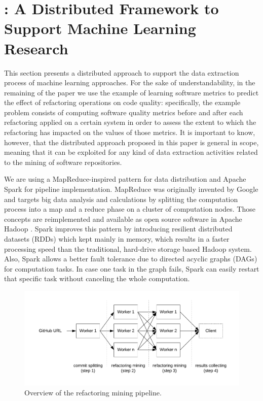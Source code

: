 
\section{\iris: A Distributed Framework to Support Machine Learning Research}
\label{sec:approach}

This section presents a distributed approach to support the data extraction process of machine learning approaches. For the sake of understandability, in the remaining of the paper we use the example of learning software metrics to predict the effect of refactoring operations on code quality: specifically, the example problem consists of computing software quality metrics before and after each refactoring applied on a certain system in order to assess the extent to which the refactoring has impacted on the values of those metrics. It is important to know, however, that the distributed approach proposed in this paper is general in scope, meaning that it can be exploited for any kind of data extraction activities related to the mining of software repositories. 

We are using a MapReduce-inspired pattern for data distribution and Apache Spark for pipeline implementation. MapReduce was originally invented by Google and targets big data analysis and calculations by splitting the computation process into a map and a reduce phase \cite{mapreduce2008} on a cluster of computation nodes. Those concepts are reimplemented and available as open source software in Apache Hadoop \cite{hadoop}. Spark improves this pattern by introducing resilient distributed datasets (RDDs) which kept mainly in memory, which results in a faster processing speed than the traditional, hard-drive storage based Hadoop system. Also, Spark allows a better fault tolerance due to directed acyclic graphs (DAGs) for computation tasks. In case one task in the graph fails, Spark can easily restart that specific task without canceling the whole computation.

\begin{figure}
\caption{Overview of the refactoring mining pipeline.}
\centering
\includegraphics[scale=0.6]{pipeline}
\end{figure}

